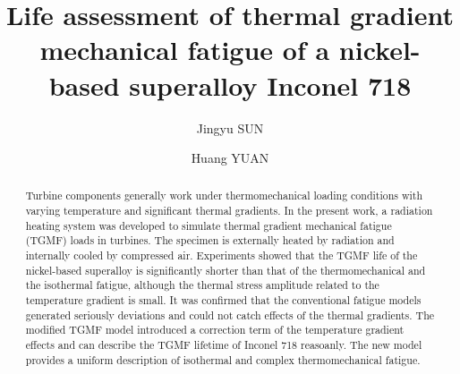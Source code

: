 \documentclass[preprint,5p,twocolumn,10pt,sort&compress]{elsarticle}
\begin{document}


\renewcommand\figureautorefname{Fig.}


\begin{frontmatter}



\title{Life assessment of thermal gradient mechanical fatigue of a nickel-based superalloy Inconel 718}


\author{Jingyu SUN}
\author{Huang YUAN}

\address{School of Aerospace Engineering, Tsinghua University, Beijing, China}

\begin{abstract}
Turbine components generally work under thermomechanical loading conditions with varying temperature and significant thermal gradients. In the present work, a radiation heating system was developed to simulate thermal gradient mechanical fatigue (TGMF) loads in turbines. The specimen is externally heated by radiation and internally cooled by compressed air. Experiments showed that the TGMF life of the nickel-based superalloy is significantly shorter than that of the thermomechanical and the isothermal fatigue, although the thermal stress amplitude related to the temperature gradient is small. It was confirmed that the conventional fatigue models generated seriously deviations and could not catch effects of the thermal gradients. The modified TGMF model introduced a correction term of the temperature gradient effects and can describe the TGMF lifetime of Inconel 718 reasoanly. The new model provides a uniform description of isothermal and complex thermomechanical fatigue. 
\end{abstract}


\end{frontmatter}
\end{document}
